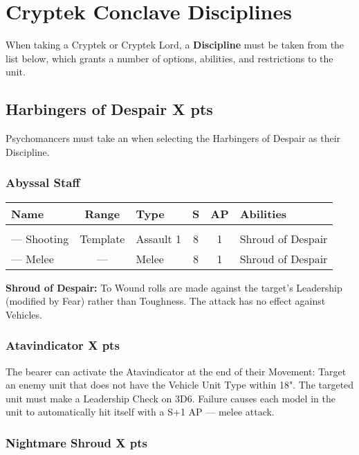 \section{Cryptek Conclave Disciplines} \label{Cryptek Conclave Discipline}

When taking a Cryptek or Cryptek Lord, a \textbf{Discipline} must be taken from the list below, which grants a number of options, abilities, and restrictions to the unit.

\subsection[Harbingers of Despair ]{Harbingers of Despair  \hrulefill X pts}

Psychomancers must take an  when selecting the Harbingers of Despair as their Discipline.

\subsubsection{Abyssal Staff}

\label{Abyssal Staff}
\noindent
\begin{NiceTabular}{L{115 pt} c C{40pt} *{2}{c} >{\raggedright\arraybackslash}p{240pt}}
	Name & Range & Type & S & AP & Abilities \\
	\hline
	 &  &  &  &  & \\
	— Shooting & Template & Assault 1 & 8 & 1 & Shroud of Despair \\
	— Melee & — & Melee & 8 & 1 & Shroud of Despair \\
\end{NiceTabular}

\textbf{Shroud of Despair:} To Wound rolls are made against the target's Leadership (modified by Fear) rather than Toughness. The attack has no effect against Vehicles.

\subsubsection[Atavindicator ]{Atavindicator  \hrulefill X pts}

The bearer can activate the Atavindicator at the end of their Movement: Target an enemy unit that does not have the Vehicle Unit Type within 18". The targeted unit must make a Leadership Check on 3D6. Failure causes each model in the unit to automatically hit itself with a S+1 AP — melee attack.

\subsubsection[Nightmare Shroud ]{Nightmare Shroud  \hrulefill X pts} 

